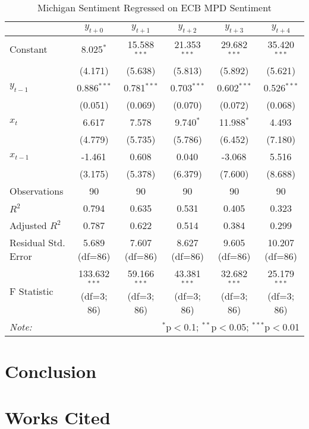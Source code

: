 \documentclass [12pt]{article}
\begin{document}
\begin{table}[H] 
    \centering
  \caption{Michigan Sentiment Regressed on ECB MPD Sentiment}
  \begin{adjustbox}{width=\textwidth}
  \begin{tabular}{lccccc}
  \hline
  \hline
   & $y_{t+0}$ & $y_{t+1}$ & $y_{t+2}$ & $y_{t+3}$ & $y_{t+4}$  \\
  \hline
   Constant & 8.025$^{*}$ & 15.588$^{***}$ & 21.353$^{***}$ & 29.682$^{***}$ & 35.420$^{***}$ \\
  & (4.171) & (5.638) & (5.813) & (5.892) & (5.621) \\
   $y_{t-1}$ & 0.886$^{***}$ & 0.781$^{***}$ & 0.703$^{***}$ & 0.602$^{***}$ & 0.526$^{***}$ \\
  & (0.051) & (0.069) & (0.070) & (0.072) & (0.068) \\
   $x_{t}$ & 6.617$^{}$ & 7.578$^{}$ & 9.740$^{*}$ & 11.988$^{*}$ & 4.493$^{}$ \\
  & (4.779) & (5.735) & (5.786) & (6.452) & (7.180) \\
   $x_{t-1}$ & -1.461$^{}$ & 0.608$^{}$ & 0.040$^{}$ & -3.068$^{}$ & 5.516$^{}$ \\
  & (3.175) & (5.378) & (6.379) & (7.600) & (8.688) \\
  \hline
   Observations & 90 & 90 & 90 & 90 & 90 \\
   $R^2$ & 0.794 & 0.635 & 0.531 & 0.405 & 0.323 \\
   Adjusted $R^2$ & 0.787 & 0.622 & 0.514 & 0.384 & 0.299 \\
   Residual Std. Error & 5.689 (df=86) & 7.607 (df=86) & 8.627 (df=86) & 9.605 (df=86) & 10.207 (df=86) \\
   F Statistic & 133.632$^{***}$ (df=3; 86) & 59.166$^{***}$ (df=3; 86) & 43.381$^{***}$ (df=3; 86) & 32.682$^{***}$ (df=3; 86) & 25.179$^{***}$ (df=3; 86) \\
  \hline
  \hline
  \textit{Note:} & \multicolumn{5}{r}{$^{*}$p$<$0.1; $^{**}$p$<$0.05; $^{***}$p$<$0.01} \\
  \end{tabular}
  \end{adjustbox}
  \end{table}

\section{Conclusion}


\section{Works Cited}



\end{document}
